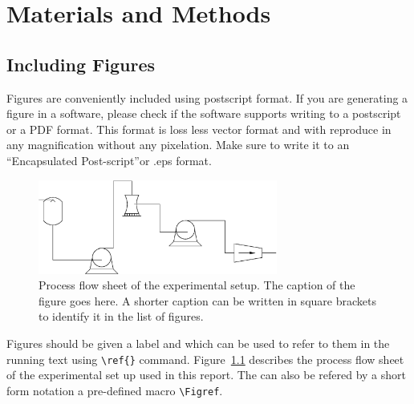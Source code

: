 
\chapter{Materials and Methods}

\section{Including Figures}

Figures are conveniently included using postscript format.  If you are
generating a figure in a software, please check if the software
supports writing to a postscript or a PDF format. This format is loss
less vector format and with reproduce in any magnification without any
pixelation. Make sure to write it to an ``Encapsulated Post-script''or
.eps format.


\begin{figure}[tbp]
  \centering
    \includegraphics[width=0.7\textwidth]{profflow}
    \caption[Process flow sheet]{Process flow sheet of the
      experimental setup. The caption of the figure goes here. A
      shorter caption can be written in square brackets to identify it
      in the list of figures.}
    \label{fig:pfs} 
\end{figure}

Figures should be given a label and which can be used to refer to them
in the running text using \verb|\ref{}| command. Figure~\ref{fig:pfs}
describes the process flow sheet of the experimental set up used in
this report. The  can also be refered by a short form notation
a pre-defined macro \verb"\Figref".



